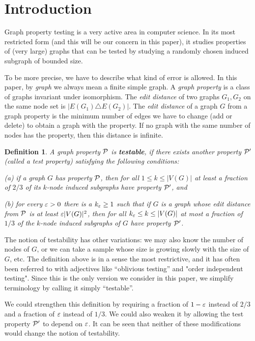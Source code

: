 \documentclass{article}
\newtheorem{definition}[theorem]{Definition}
\begin{document}
\section{Introduction}

Graph property testing is a very active area in computer science. In
its most restricted form (and this will be our concern in this
paper), it studies properties of (very large) graphs that can be
tested by studying a randomly chosen induced subgraph of bounded
size.

To be more precise, we have to describe what kind of error is
allowed. In this paper, by {\it graph} we always mean a finite simple
graph. A {\it graph property} is a class of graphs invariant under
isomorphism. The {\it edit distance} of two graphs $G_1,G_2$ on the
same node set is $|E(G_1)\triangle E(G_2)|$. The {\it edit distance}
of a graph $G$ from a graph property is the minimum number of edges
we have to change (add or delete) to obtain a graph with the
property. If no graph with the same number of nodes has the property,
then this distance is infinite.

\begin{definition}\label{PROPTEST}
A graph property $\mathcal{P}$ is {\bf testable}, if there exists another
property $\mathcal{P}'$ (called a {\it test property}) satisfying the
following conditions:

\smallskip

(a) if a graph $G$ has property $\mathcal{P}$, then for all $1\le k\le
|V(G)|$ at least a fraction of $2/3$ of its $k$-node induced
subgraphs have property $\mathcal{P}'$, and

\smallskip

(b) for every $\varepsilon>0$ there is a $k_\varepsilon\ge 1$ such that if $G$ is a
graph whose edit distance from $\mathcal{P}$ is at least $\varepsilon |V(G)|^2$,
then for all $k_\varepsilon\le k\le |V(G)|$ at most a fraction of $1/3$ of
the $k$-node induced subgraphs of $G$ have property $\mathcal{P}'$.
\end{definition}

The notion of testability has other variations: we may also know the
number of nodes of $G$, or we can take a sample whose size is growing
slowly with the size of $G$, etc. The definition above is in a sense
the most restrictive, and it has often been referred to with
adjectives like ``oblivious testing'' and "order independent
testing". Since this is the only version we consider in this paper,
we simplify terminology by calling it simply ``testable''.

We could strengthen this definition by requiring a fraction of
$1-\varepsilon$ instead of $2/3$ and a fraction of $\varepsilon$ instead of $1/3$.
We could also weaken it by allowing the test property $\mathcal{P}'$ to
depend on $\varepsilon$. It can be seen that neither of these modifications
would change the notion of testability.
\end{document}
